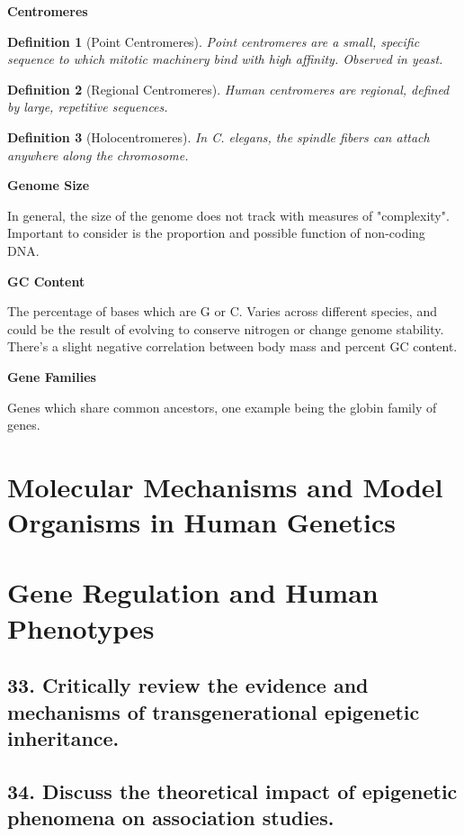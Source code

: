 \documentclass{tufte-handout}
\theoremstyle{noparens}
\newtheorem*{define}{Definition}
\begin{document}
\textbf{Centromeres}

\begin{define}[Point Centromeres]
Point centromeres are a small, specific sequence to which mitotic machinery bind with high affinity. Observed in yeast.
\end{define}

\begin{define}[Regional Centromeres]
Human centromeres are regional, defined by large, repetitive sequences.
\end{define}

\begin{define}[Holocentromeres]
In \emph{C. elegans}, the spindle fibers can attach anywhere along the chromosome.
\end{define}

\textbf{Genome Size}

In general, the size of the genome does not track with measures of "complexity". Important to consider is the proportion and possible function of non-coding DNA.

\textbf{GC Content}

The percentage of bases which are G or C. Varies across different species, and could be the result of evolving to conserve nitrogen or change genome stability. There's a slight negative correlation between body mass and percent GC content.

\textbf{Gene Families}

Genes which share common ancestors, one example being the globin family of genes.

\section{Molecular Mechanisms and Model Organisms in Human Genetics}\label{sec:molecmech}

\section{Gene Regulation and Human Phenotypes}\label{sec:genreg}
\subsection{33. Critically review the evidence and mechanisms of transgenerational epigenetic inheritance.}

\newpage
\subsection{34. Discuss the theoretical impact of epigenetic phenomena on association studies.}
\end{document}
